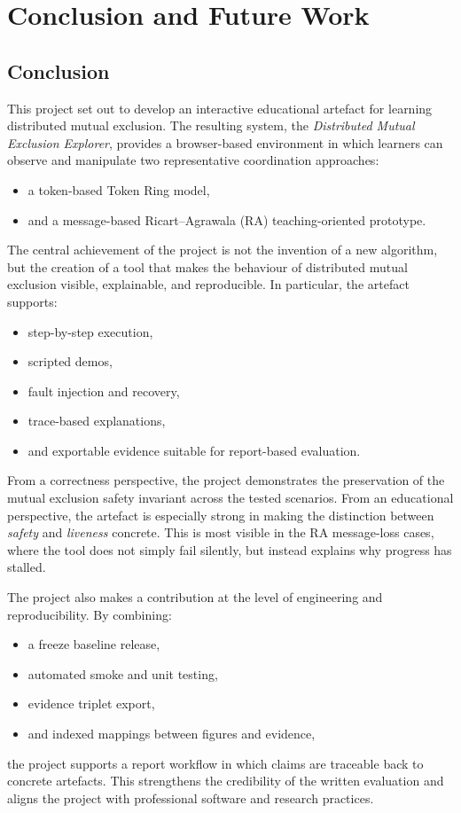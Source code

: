 \chapter{Conclusion and Future Work}
\label{ch:conclusion}

\section{Conclusion}
This project set out to develop an interactive educational artefact for learning distributed mutual exclusion. The resulting system, the \emph{Distributed Mutual Exclusion Explorer}, provides a browser-based environment in which learners can observe and manipulate two representative coordination approaches:
\begin{itemize}
  \item a token-based Token Ring model,
  \item and a message-based Ricart--Agrawala (RA) teaching-oriented prototype.
\end{itemize}

The central achievement of the project is not the invention of a new algorithm, but the creation of a tool that makes the behaviour of distributed mutual exclusion visible, explainable, and reproducible. In particular, the artefact supports:
\begin{itemize}
  \item step-by-step execution,
  \item scripted demos,
  \item fault injection and recovery,
  \item trace-based explanations,
  \item and exportable evidence suitable for report-based evaluation.
\end{itemize}

From a correctness perspective, the project demonstrates the preservation of the mutual exclusion safety invariant across the tested scenarios. From an educational perspective, the artefact is especially strong in making the distinction between \emph{safety} and \emph{liveness} concrete. This is most visible in the RA message-loss cases, where the tool does not simply fail silently, but instead explains why progress has stalled.

The project also makes a contribution at the level of engineering and reproducibility. By combining:
\begin{itemize}
  \item a freeze baseline release,
  \item automated smoke and unit testing,
  \item evidence triplet export,
  \item and indexed mappings between figures and evidence,
\end{itemize}
the project supports a report workflow in which claims are traceable back to concrete artefacts. This strengthens the credibility of the written evaluation and aligns the project with professional software and research practices.

